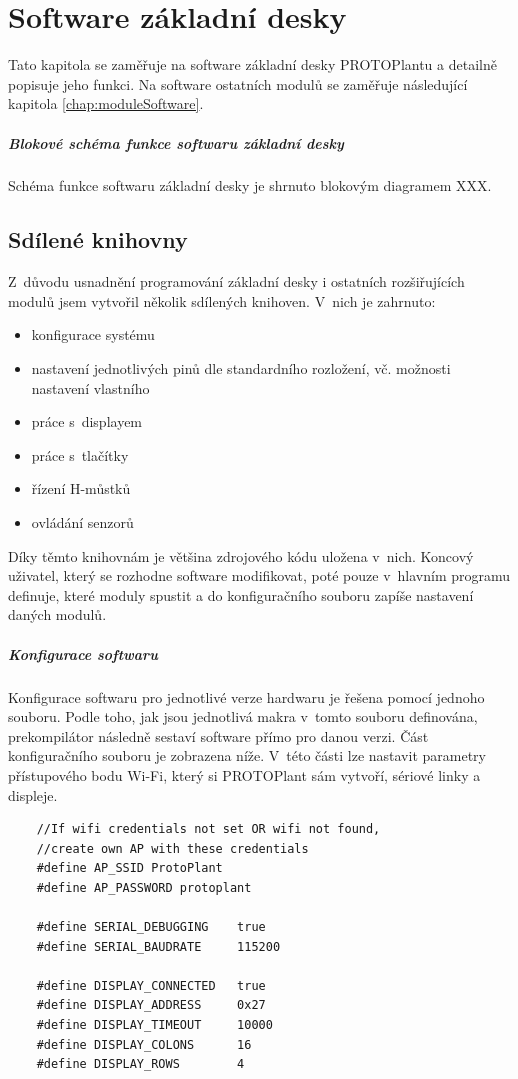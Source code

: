 \chapter{Software základní desky}
Tato kapitola se zaměřuje na software základní desky PROTOPlantu a detailně popisuje jeho funkci.
Na software ostatních modulů se zaměřuje následující kapitola \ref{chap:moduleSoftware}.

\paragraph{Blokové schéma funkce softwaru základní desky}
Schéma funkce softwaru základní desky je shrnuto blokovým diagramem XXX.

\section{Sdílené knihovny}
Z~důvodu usnadnění programování základní desky i ostatních rozšiřujících modulů jsem vytvořil několik sdílených knihoven. 
V~nich je zahrnuto:
\begin{itemize}
    \item konfigurace systému
    \item nastavení jednotlivých pinů dle standardního rozložení, vč. možnosti nastavení vlastního
    \item práce s~displayem
    \item práce s~tlačítky
    \item řízení H-můstků
    \item ovládání senzorů
\end{itemize}
Díky těmto knihovnám je většina zdrojového kódu uložena v~nich. 
Koncový uživatel, který se rozhodne software modifikovat, poté pouze v~hlavním programu definuje, které moduly spustit a do konfiguračního souboru zapíše nastavení daných modulů.

\paragraph{Konfigurace softwaru}
Konfigurace softwaru pro jednotlivé verze hardwaru je řešena pomocí jednoho souboru.
Podle toho, jak jsou jednotlivá makra v~tomto souboru definována, prekompilátor následně sestaví software přímo pro danou verzi.
Část konfiguračního souboru je zobrazena níže.
V~této části lze nastavit parametry přístupového bodu Wi-Fi, který si PROTOPlant sám vytvoří, sériové linky a displeje.
\begin{lstlisting}
    //If wifi credentials not set OR wifi not found, 
    //create own AP with these credentials
    #define AP_SSID ProtoPlant
    #define AP_PASSWORD protoplant
    
    #define SERIAL_DEBUGGING    true
    #define SERIAL_BAUDRATE     115200
    
    #define DISPLAY_CONNECTED   true
    #define DISPLAY_ADDRESS     0x27
    #define DISPLAY_TIMEOUT     10000
    #define DISPLAY_COLONS      16
    #define DISPLAY_ROWS        4
\end{lstlisting}

